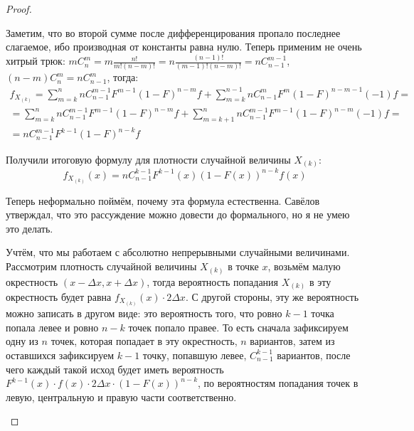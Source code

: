 \begin{proof}
\begin{itemize}
        Заметим, что во второй сумме после дифференцирования пропало последнее слагаемое, ибо производная от константы равна нулю. Теперь применим не очень хитрый трюк: $m C_n^m = m \frac{n!}{m!(n-m)!} = n \frac{(n-1)!}{(m-1)!(n-m)!} = n C_{n-1}^{m-1}$, $(n-m) C_n^m = n C_{n-1}^m$, тогда:
        \begin{multline*}
            f_{X_{(k)}} = \sum_{m=k}^n n C_{n-1}^{m-1} F^{m-1} (1-F)^{n-m} f + \sum_{m=k}^{n-1} n C_{n-1}^m F^m (1-F)^{n-m-1} (-1) f =
            \\
            = \sum_{m=k}^n n C_{n-1}^{m-1} F^{m-1} (1-F)^{n-m} f + \sum_{m=k+1}^{n} n C_{n-1}^{m-1} F^{m-1} (1-F)^{n-m} (-1) f =
            \\
            = n C_{n-1}^{m-1} F^{k-1} (1-F)^{n-k} f
        \end{multline*}

        Получили итоговую формулу для плотности случайной величины $X_{(k)}$:
        \[
            f_{X_{(k)}}(x) = n C_{n-1}^{k-1} F^{k-1}(x) (1-F(x))^{n-k} f(x)
        \]

        Теперь неформально поймём, почему эта формула естественна. Савёлов утверждал, что это рассуждение можно довести до формального, но я не умею это делать.
        
        Учтём, что мы работаем с абсолютно непрерывными случайными величинами. Рассмотрим плотность случайной величины $X_{(k)}$ в точке $x$, возьмём малую окрестность $(x-\Delta x, x + \Delta x)$, тогда вероятность попадания $X_{(k)}$ в эту окрестность будет равна $f_{X_{(k)}}(x) \cdot 2\Delta x$. С другой стороны, эту же вероятность можно записать в другом виде: это вероятность того, что ровно $k-1$ точка попала левее и ровно $n-k$ точек попало правее. То есть сначала зафиксируем одну из $n$ точек, которая попадает в эту окрестность, $n$ вариантов, затем из оставшихся зафиксируем $k-1$ точку, попавшую левее, $C_{n-1}^{k-1}$ вариантов, после чего каждый такой исход будет иметь вероятность $F^{k-1}(x) \cdot f(x) \cdot 2\Delta x \cdot (1-F(x))^{n-k}$, по вероятностям попадания точек в левую, центральную и правую части соответственно.


\end{itemize}
\end{proof}
